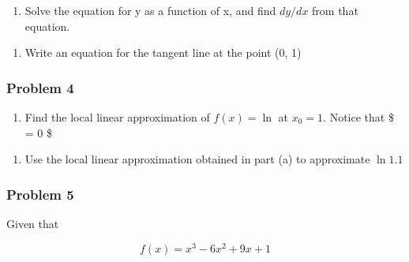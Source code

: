 \documentclass[
  letterpaper,
  DIV=11,
  numbers=noendperiod]{scrartcl}
\providecommand{\tightlist}{%
  \setlength{\itemsep}{0pt}\setlength{\parskip}{0pt}}\usepackage{longtable,booktabs,array}
\begin{document}
\begin{enumerate}
\def\labelenumi{(\alph{enumi})}
\setcounter{enumi}{1}
\tightlist
\item
  Solve the equation for y as a function of x, and find \(dy/dx\) from
  that equation.
\end{enumerate}

\thispagestyle{empty}

\hfill\break
\hfill\break
\hfill\break
\hfill\break
\hfill\break
\hfill\break
\hfill\break
\hfill\break
\hfill\break
\hfill\break
\hfill\break
\hfill\break
\hfill\break
\hfill\break

\begin{enumerate}
\def\labelenumi{(\alph{enumi})}
\setcounter{enumi}{2}
\tightlist
\item
  Write an equation for the tangent line at the point (0, 1)\\
\end{enumerate}

\newpage{}

\subsubsection{Problem 4}\label{problem-4}

\begin{enumerate}
\def\labelenumi{(\alph{enumi})}
\tightlist
\item
  Find the local linear approximation of \(f(x) = \ln\) at \(x_0 = 1\).
  Notice that \$ = 0 \$
\end{enumerate}

\thispagestyle{empty}

\hfill\break
\hfill\break
\hfill\break
\hfill\break
\hfill\break
\hfill\break
\hfill\break
\hfill\break
\hfill\break
\hfill\break
\hfill\break

\begin{enumerate}
\def\labelenumi{(\alph{enumi})}
\setcounter{enumi}{1}
\tightlist
\item
  Use the local linear approximation obtained in part (a) to approximate
  \(\ln{1.1}\)
\end{enumerate}

\newpage{}

\subsubsection{Problem 5}\label{problem-5}

Given that

\[f(x) =  x^3 - 6x^2 + 9x + 1\]
\end{document}
